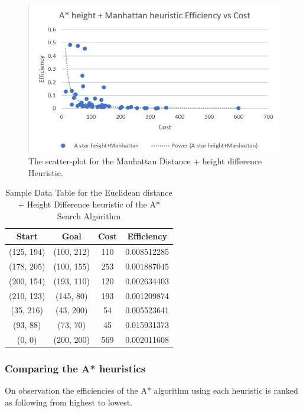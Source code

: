 \documentclass[11pt,oneside]{article}
\begin{document}
\begin{figure}[H]
    \centering
      \includegraphics[scale=0.8]{MD+HD efficiency vs cost.JPG}
      \caption{The scatter-plot for the Manhattan Distance + height difference Heuristic.}
      \label{fig:MDHDEvC}
    \end{figure} 
    
    \begin{table}[H]
    \centering
    \begin{tabular}{|c|c|c|c|}
        Start        & Goal       & Cost & Efficiency \\ \hline
        (125, 194)   & (100, 212) & 110 & 0.008512285 \\
        (178, 205)   & (100, 155) & 253 & 0.001887045 \\
        (200, 154)   & (193, 110) & 120 & 0.002634403 \\
        (210, 123)   & (145, 80)  & 193 & 0.001209874 \\
        (35, 216)    & (43, 200)  & 54 & 0.005523641 \\
        (93, 88)     & (73, 70)   & 45 & 0.015931373 \\
        (0, 0)       & (200, 200) & 569 & 0.002011608 \\
    \end{tabular}
    \caption{Sample Data Table for the Euclidean distance + Height Difference heuristic of the A* Search Algorithm}
    \label{tab:my_label}
\end{table}

\subsubsection{Comparing the A* heuristics}
On observation the efficiencies of the A* algorithm using each heuristic is ranked as following from highest to lowest.
\end{document}

